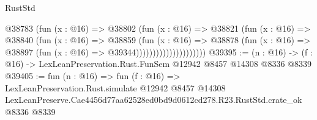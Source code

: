 \begin{lexlean}{RustStd}
\begin{coremodule}
                              @38783
                                (fun (x : @16) =>
                                @38802
                                  (fun (x : @16) =>
                                  @38821
                                    (fun (x : @16) =>
                                    @38840
                                      (fun (x : @16) =>
                                      @38859
                                        (fun (x : @16) =>
                                        @38878
                                          (fun (x : @16) =>
                                          @38897 (fun (x : @16) => @39344)))))))))))))))))))))
@39395 := (n : @16) -> (f : @16) -> LexLeanPreservation.Rust.FunSem @12942 @8457 @14308 @8336 @8339
@39405 := fun (n : @16) =>
  fun (f : @16) =>
  LexLeanPreservation.Rust.simulate
    @12942
    @8457
    @14308
    LexLeanPreserve.Cae4456d77aa62528ed0bd9d0612cd278.R23.RustStd.crate_ok
    @8336
    @8339
\end{coremodule}
\end{lexlean}
